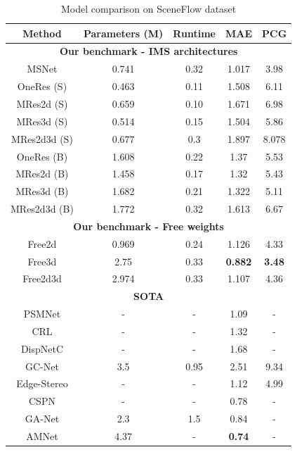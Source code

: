 \documentclass[runningheads]{llncs}
\begin{document}
\begin{table}[!htbp]
    \centering
    \begin{tabular}{ c|c|c|c|c }
    Method & Parameters (M) & Runtime & MAE & PCG \\
    
    \hline
    \multicolumn{5}{c}{ \textbf{Our benchmark - IMS architectures} } \\
    \hline
    MSNet & 0.741 & 0.32 & 1.017 & 3.98 \\
    \hline
    OneRes (S) & 0.463 & 0.11 & 1.508 & 6.11 \\
    MRes2d (S) & 0.659 & 0.10 & 1.671 & 6.98 \\
    MRes3d (S) & 0.514 & 0.15 & 1.504 & 5.86 \\
    MRes2d3d (S) & 0.677 & 0.3 & 1.897 & 8.078 \\
    \hline
    OneRes (B) & 1.608 & 0.22 & 1.37 & 5.53 \\
    MRes2d (B) & 1.458 & 0.17 & 1.32 & 5.43 \\
    MRes3d (B) & 1.682 & 0.21 & 1.322 & 5.11 \\
    MRes2d3d (B) & 1.772 & 0.32 & 1.613 & 6.67 \\
    \hline
    \multicolumn{5}{c}{ \textbf{Our benchmark - Free weights} } \\
    \hline
    Free2d & 0.969 & 0.24 & 1.126 & 4.33 \\
    Free3d & 2.75 & 0.33 & \textbf{0.882} & \textbf{3.48} \\
    Free2d3d & 2.974 & 0.33 & 1.107 & 4.36 \\
    \hline
    \multicolumn{5}{c}{ \textbf{SOTA} } \\
    \hline
    PSMNet\cite{Chang2018PyramidNetwork} & - & - & 1.09 & - \\
    CRL\cite{Pang2018CascadeMatching} & - & - & 1.32 & - \\
    DispNetC\cite{Mayer2016ALD} & - & - & 1.68 & - \\
    GC-Net\cite{Kendall2017End-to-EndRegression} & 3.5 & 0.95 & 2.51 & 9.34 \\
    Edge-Stereo\cite{SongEdgeStereoResidual} & - & - & 1.12 & 4.99 \\
    CSPN\cite{cheng2018learning} & - & - & 0.78 & - \\
    GA-Net\cite{zhang2019ga} & 2.3 & 1.5 & 0.84 & - \\
    AMNet\cite{du2019amnet} & 4.37 & - & \textbf{0.74} & - \\
    
    \hline
    \end{tabular}
    \caption{Model comparison on SceneFlow dataset}
    \label{tab:results}
\end{table}
\end{document}
